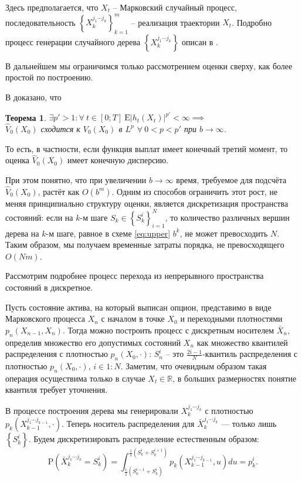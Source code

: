 \documentclass[specialist,
               substylefile = ../spbu.rtx,
               subf,href,colorlinks=true, 12pt]{disser}
\newtheorem{theorem}{Теорема}
\newcommand{\ev}{\mathrm{E}}
\newcommand{\prob}[1]{\mathrm{P}\left(#1\right)}
\newcommand{\R}{\ensuremath{\mathbb{R}}}
\newcommand{\Vhat}{\hat{V}}
\begin{document}
    Здесь предполагается, что $X_t$ -- Марковский случайный процесс, последовательность $\left\lbrace X_k^{j_1\cdots j_k}\right\rbrace_{k=1}^m$ -- реализация траектории $X_t$. Подробно процесс генерации случайного дерева $\left\lbrace X_k^{j_1\cdots j_k}\right\rbrace$ описан в \cite{Broadie1997}.

    В дальнейшем мы ограничимся только рассмотрением оценки сверху, как более простой по построению. 

    В \cite{Broadie1997} доказано, что 
    \begin{theorem}
        $\exists p' > 1: \forall\: t \in \left[0; T\right]\: \ev \left\vert h_t\left(X_t\right)\right\vert ^{p'} < \infty \implies$ \\
        $\Vhat_0(X_0)$ сходится к $V_0(X_0)$ в $L^p$ $\forall\: 0 < p < p'$ при $b \to \infty$.
    \end{theorem}
    То есть, в частности, если функция выплат имеет конечный третий момент, то оценка $\Vhat_0(X_0)$ имеет конечную дисперсию.

    При этом понятно, что при увеличении $b \to\infty$ время, требуемое для подсчёта $\Vhat_0(X_0)$, растёт как $O\left(b^m\right)$. Одним из способов ограничить этот рост, не меняя принципиально структуру оценки, является дискретизация пространства состояний: если на $k$-м шаге $S_k \in \left\lbrace S_k^i\right\rbrace_{i=1}^N$, то количество различных вершин дерева на $k$-м шаге, равное в схеме \eqref{eq:upper} $b^k$, не может превосходить $N$. Таким образом, мы получаем временные затраты порядка, не превосходящего $O(Nm)$.

    Рассмотрим подробнее процесс перехода из непрерывного пространства состояний в дискретное. 

    Пусть состояние актива, на который выписан опцион, представимо в виде Марковского процесса $X_n$ с началом в точке $X_0$ и переходными плотностями $p_n(X_{n-1}, X_n)$. Тогда можно построить процесс с дискретным носителем $\bar X_n$, определив множество его допустимых состояний $X_n$ как множество квантилей распределения с плотностью $p_n\left(X_0, \cdot\right)$: $S_n^i$ -- это $\frac{2i - 1}{N}$-квантиль распределения с плотностью $p_n\left(X_0, \cdot\right)$, $i\in 1\mathbin{:} N$. Заметим, что очевидным образом такая операция осуществима только в случае $X_t\in\R$, в больших размерностях понятие квантиля требует уточнения.

    В процессе построения дерева мы генерировали $X_k^{j_1\cdots j_k}$ с плотностью $p_k\left(X_{k-1}^{j_1\cdots j_{k-1}}, \cdot \right)$. Теперь носитель распределения для $\bar X_k^{j_1\cdots j_k}$ --- только лишь $\left\lbrace S_k^i\right\rbrace$. Будем дискретизировать распределение естественным образом:
    \[
        \prob{\bar X_k^{j_1\cdots j_k} = S_k^i} = \int_{\frac{1}{2}\left(S_k^{i-1} + S_k^{i}\right)}^{\frac{1}{2}\left(S_k^{i} + S_k^{i+1}\right)} p_k\left(X_{k-1}^{j_1\cdots j_{k-1}}, u\right) du = p_k^i.
    \]
\end{document}
